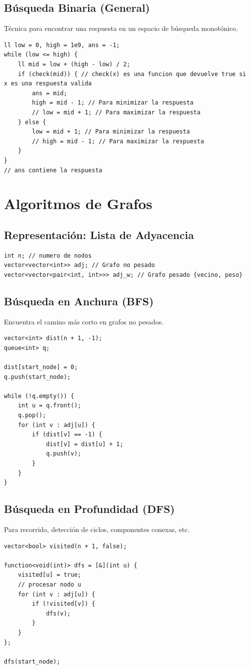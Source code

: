 \documentclass[11pt, a4paper]{article}
\begin{document}
\subsection{Búsqueda Binaria (General)}
Técnica para encontrar una respuesta en un espacio de búsqueda monotónico.
\begin{lstlisting}
ll low = 0, high = 1e9, ans = -1;
while (low <= high) {
    ll mid = low + (high - low) / 2;
    if (check(mid)) { // check(x) es una funcion que devuelve true si x es una respuesta valida
        ans = mid;
        high = mid - 1; // Para minimizar la respuesta
        // low = mid + 1; // Para maximizar la respuesta
    } else {
        low = mid + 1; // Para minimizar la respuesta
        // high = mid - 1; // Para maximizar la respuesta
    }
}
// ans contiene la respuesta
\end{lstlisting}

\section{Algoritmos de Grafos}

\subsection{Representación: Lista de Adyacencia}
\begin{lstlisting}
int n; // numero de nodos
vector<vector<int>> adj; // Grafo no pesado
vector<vector<pair<int, int>>> adj_w; // Grafo pesado {vecino, peso}
\end{lstlisting}

\subsection{Búsqueda en Anchura (BFS)}
Encuentra el camino más corto en grafos no pesados.
\begin{lstlisting}
vector<int> dist(n + 1, -1);
queue<int> q;

dist[start_node] = 0;
q.push(start_node);

while (!q.empty()) {
    int u = q.front();
    q.pop();
    for (int v : adj[u]) {
        if (dist[v] == -1) {
            dist[v] = dist[u] + 1;
            q.push(v);
        }
    }
}
\end{lstlisting}

\subsection{Búsqueda en Profundidad (DFS)}
Para recorrido, detección de ciclos, componentes conexas, etc.
\begin{lstlisting}
vector<bool> visited(n + 1, false);

function<void(int)> dfs = [&](int u) {
    visited[u] = true;
    // procesar nodo u
    for (int v : adj[u]) {
        if (!visited[v]) {
            dfs(v);
        }
    }
};

dfs(start_node);
\end{lstlisting}
\end{document}
